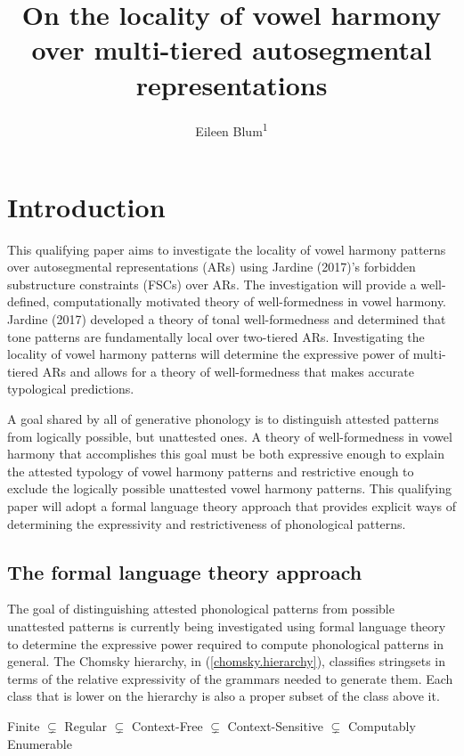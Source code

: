 \documentclass[,doc,floatsintext]{apa6}
\title{On the locality of vowel harmony over multi-tiered autosegmental
representations}
\author{Eileen Blum\textsuperscript{1}}
\date{}
\affiliation{
\vspace{0.5cm}
\textsuperscript{1} Rutgers University}
\theoremstyle{definition}
\theoremstyle{definition}
\theoremstyle{definition}
\theoremstyle{remark}
\begin{document}
\maketitle

\section{Introduction}\label{introduction}

This qualifying paper aims to investigate the locality of vowel harmony
patterns over autosegmental representations (ARs) using Jardine (2017)'s
forbidden substructure constraints (FSCs) over ARs. The investigation
will provide a well-defined, computationally motivated theory of
well-formedness in vowel harmony. Jardine (2017) developed a theory of
tonal well-formedness and determined that tone patterns are
fundamentally local over two-tiered ARs. Investigating the locality of
vowel harmony patterns will determine the expressive power of
multi-tiered ARs and allows for a theory of well-formedness that makes
accurate typological predictions.

A goal shared by all of generative phonology is to distinguish attested
patterns from logically possible, but unattested ones. A theory of
well-formedness in vowel harmony that accomplishes this goal must be
both expressive enough to explain the attested typology of vowel harmony
patterns and restrictive enough to exclude the logically possible
unattested vowel harmony patterns. This qualifying paper will adopt a
formal language theory approach that provides explicit ways of
determining the expressivity and restrictiveness of phonological
patterns.

\subsection{The formal language theory
approach}\label{the-formal-language-theory-approach}

The goal of distinguishing attested phonological patterns from possible
unattested patterns is currently being investigated using formal
language theory to determine the expressive power required to compute
phonological patterns in general. The Chomsky hierarchy, in
(\ref{chomsky.hierarchy}), classifies stringsets in terms of the
relative expressivity of the grammars needed to generate them. Each
class that is lower on the hierarchy is also a proper subset of the
class above it.

\begin{exe}
\label{chomsky.hierarchy} 
Finite $\subsetneq$ Regular $\subsetneq$ Context-Free $\subsetneq$ Context-Sensitive $\subsetneq$ Computably Enumerable
\end{exe}
\end{document}
